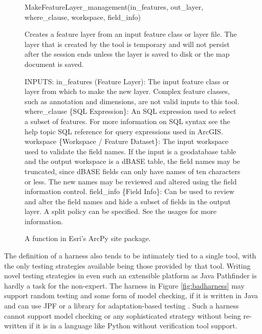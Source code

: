 \begin{figure}[t]
{\scriptsize
\begin{code}
MakeFeatureLayer\_management(in\_features, out\_layer, {where\_clause}, {workspace}, {field\_info})
   
   Creates a feature layer from an input feature class or layer file. The layer
   that is created by the tool is temporary and will not persist after the session
   ends unless the layer is saved to disk or the map document is saved.
    
INPUTS:
 in\_features (Feature Layer):
     The input feature class or layer from which to make the new layer. Complex
     feature classes, such as annotation and dimensions, are not
     valid inputs to this
     tool.
 where\_clause \{SQL Expression\}:
     An SQL expression used to select a subset of features. For more information on
     SQL syntax see the help topic SQL reference for query expressions used in
     ArcGIS.
 workspace \{Workspace / Feature Dataset\}:
     The input workspace used to validate the field names. If the input is a
     geodatabase table and the output workspace is a dBASE table, the field names may
     be truncated, since dBASE fields can only have names of ten characters or less.
     The new names may be reviewed and altered using the field information control.
 field\_info \{Field Info\}:
     Can be used to review and alter the field names and hide a subset of fields in
     the output layer. A split policy can be specified. See the usages for more
     information.
\end{code}
}
\vspace{-0.1in}
\caption{A function in Esri's ArcPy site package.}
\label{fig:MakeFeatureLayer}
\vspace{-0.20in}
\end{figure}

The definition of a harness also tends to be intimately tied to a
single tool, with the only testing strategies available being those
provided by that tool.  Writing novel testing strategies in even such
an extensible platform as Java Pathfinder is hardly a task for the
non-expert.
The harness in Figure \ref{fig:badharness} may support random testing and
some form of model checking, if it is written in Java and can use JPF
or a library for adaptation-based testing \cite{ISSRE12}. Such a
harness cannot support model checking or any sophisticated strategy
without being re-written if it is in a language like Python without
verification tool support.

